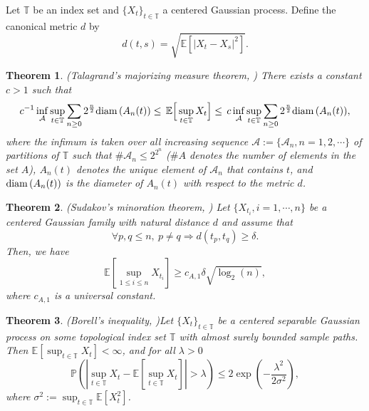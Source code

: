 \documentclass[11pt,reqno]{amsart}
\numberwithin{equation}{section}
\newtheorem{theorem}{Theorem}[section]
\def\EE{\mathbb{E}}
\def\cA{\mathcal{A}}
\newcommand\bp{\mathbb{P}}
\newcommand\diam { {\rm{diam\,}}}
\newcommand{\1}{{\bf 1}}
\newcommand{\2}{{\bf 2}}
\newcommand{\Blk}{\Big[}
\newcommand{\Brk}{\Big]}
\newcommand{\lc}{\left(}
\newcommand{\rc}{\right)}
\newcommand{\lt}{\left }
\newcommand{\rt}{\right}
\begin{document}
 Let $\mathbb T$ be an index set and $\{X_t\}_{t\in \mathbb T}$ a centered Gaussian process. Define the canonical metric $d$   by
 	 $$d(t,s)=\sqrt{\EE\left[|X_t-X_s|^2\right]}.$$
\begin{theorem} {\rm (Talagrand's majorizing measure theorem, \cite[Theorem 2.4.1]{Talagrand2014})} \label{Talagrand} 
  There exists a constant $c>1$ such that  
 	\begin{equation}\label{lem1}
 	c^{-1}\inf_\cA \sup_{t\in \mathbb T} \sum_{n\geq 0}2^{\frac{n}{2}} \diam(A_n(t))\le \, \EE\Blk \sup_{t\in \mathbb T} X_t \Brk\leq\, c\inf_\cA \sup_{t\in \mathbb T} \sum_{n\geq 0}2^{\frac{n}{2}} \diam(A_n(t)),
 	\end{equation}
 	where   the infimum is taken over all increasing sequence $\cA:=\{\cA_n, n=1, 2, \cdots\}  $ of partitions of $\mathbb T$ such that $\#\cA_n  \leq 2^{2^n}$ ($\#A$ denotes the number of elements in the  set $A$),   $A_n(t)$ denotes the unique element of $\cA_n$ that contains $t$, and $\diam(A_n(t))$ is the diameter  of $A_n(t)$ with respect to the  metric $d$.
 \end{theorem}


\begin{theorem}{\rm (Sudakov's minoration theorem, \cite[Lemma 2.4.2]{Talagrand2014})} \label{Sudakov}
Let $\{X_{t_i},i=1,\cdots,n\}$ be a centered Gaussian family with natural distance $d$ and assume that
\[
\forall p,q \leq n,~p\neq q \Rightarrow d(t_p,t_q)\geq \delta.
\]
Then, we have
\begin{equation}\label{lem2}
\EE\left[\sup_{1\leq i\leq n} X_{t_i} \right] \geq  c_{A,1} \delta   \sqrt{\log_2(n)},
\end{equation}
where $c_{A,1}$ is a universal constant.
\end{theorem}








\begin{theorem} { \rm (Borell's inequality, \cite[Theorem 2.1]{adler})}\label{Borell}
Let $\{X_t\}_{t\in \mathbb T}$  be a centered separable Gaussian process on some topological index set $\mathbb T$
with almost surely bounded sample paths. Then $\EE\left[\sup_{t\in  \mathbb T} X_t\right]<\infty$, and for all $\lambda>0$
	\begin{equation}\label{lem3}
	\bp\lt(\lt|\sup_{t\in \mathbb T} X_t-\EE\left[\sup_{t\in \mathbb T} X_t\right]\rt|>\lambda\rt)\leq 2\exp\lc-\frac {\lambda^2}{2\sigma^2}\rc,
	\end{equation}
	where $\sigma^2:=\sup_{t\in \mathbb T}\EE\left[X_t^2\right]$.
 \end{theorem}
\end{document}
